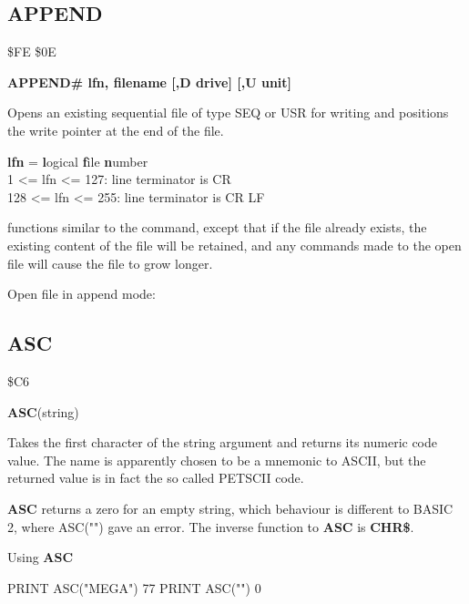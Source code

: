 \subsection{APPEND}
\begin{description}[leftmargin=3cm,style=nextline]
\item [Token:] \$FE \$0E
\item [Format:]
  {\bf APPEND\# lfn, filename [,D drive] [,U unit] }
\item [Usage:]
   Opens an existing sequential file of type
   SEQ or USR for writing and positions the write pointer
   at the end of the file.

   {\bf lfn} = {\bf l}ogical {\bf f}ile {\bf n}umber \\
   1 <= lfn <= 127: line terminator is CR \\
   128 <= lfn <= 255: line terminator is CR LF

   \filenamedefinition

   \drivedefinition

   \unitdefinition

\item [Remarks:]
    functions similar to the 
   command, except that if the file already
   exists, the existing content of the file will be retained, and any
    commands made to the
   open file will cause the file to grow longer.

\item [Example:] Open file in append mode:

\end{description}


\newpage
\subsection{ASC}
\begin{description}[leftmargin=3cm,style=nextline]
\item [Token:] \$C6
\item [Format:] {\bf ASC}(string)
\item [Usage:] Takes the first character of
               the string argument and returns its numeric code value.
               The name is apparently chosen to be a mnemonic to ASCII,
               but the returned value is in fact the so called PETSCII code.
\item [Remarks:]
               {\bf ASC} returns a zero for an empty string, which behaviour
               is different to BASIC 2, where ASC("") gave an error.
               The inverse function to {\bf ASC} is {\bf CHR\$}.
\item [Example:] Using {\bf ASC}
\begin{screenoutput}
  PRINT ASC("MEGA")
  77
  PRINT ASC("")
  0
\end{screenoutput}
\end{description}

